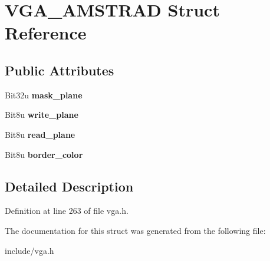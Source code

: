 \hypertarget{structVGA__AMSTRAD}{\section{V\-G\-A\-\_\-\-A\-M\-S\-T\-R\-A\-D Struct Reference}
\label{structVGA__AMSTRAD}
}
\subsection*{Public Attributes}
\begin{DoxyCompactItemize}
\item 
\hypertarget{structVGA__AMSTRAD_a3579c14ec7babb41e253a8310b9a71ed}{Bit32u {\bfseries mask\-\_\-plane}}\label{structVGA__AMSTRAD_a3579c14ec7babb41e253a8310b9a71ed}

\item 
\hypertarget{structVGA__AMSTRAD_a175865e5ad51119933b86b1a81f071dc}{Bit8u {\bfseries write\-\_\-plane}}\label{structVGA__AMSTRAD_a175865e5ad51119933b86b1a81f071dc}

\item 
\hypertarget{structVGA__AMSTRAD_adb93b9bfc436df9b90f1a7bc9d1dcfbe}{Bit8u {\bfseries read\-\_\-plane}}\label{structVGA__AMSTRAD_adb93b9bfc436df9b90f1a7bc9d1dcfbe}

\item 
\hypertarget{structVGA__AMSTRAD_ac7630605b97b058a383b751285e5de6e}{Bit8u {\bfseries border\-\_\-color}}\label{structVGA__AMSTRAD_ac7630605b97b058a383b751285e5de6e}

\end{DoxyCompactItemize}


\subsection{Detailed Description}


Definition at line 263 of file vga.\-h.



The documentation for this struct was generated from the following file\-:\begin{DoxyCompactItemize}
\item 
include/vga.\-h\end{DoxyCompactItemize}
